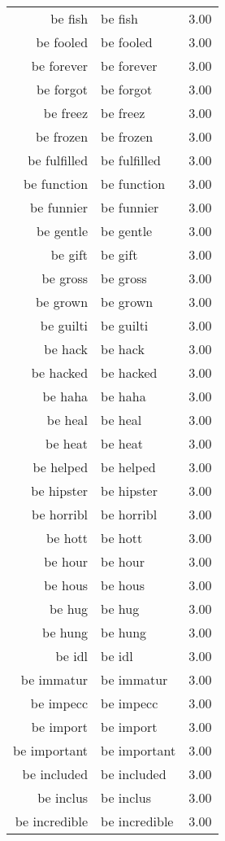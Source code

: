 \begin{table}[ht]
\begin{tabular}{rlr}
  be fish & be fish & 3.00 \\ 
  be fooled & be fooled & 3.00 \\ 
  be forever & be forever & 3.00 \\ 
  be forgot & be forgot & 3.00 \\ 
  be freez & be freez & 3.00 \\ 
  be frozen & be frozen & 3.00 \\ 
  be fulfilled & be fulfilled & 3.00 \\ 
  be function & be function & 3.00 \\ 
  be funnier & be funnier & 3.00 \\ 
  be gentle & be gentle & 3.00 \\ 
  be gift & be gift & 3.00 \\ 
  be gross & be gross & 3.00 \\ 
  be grown & be grown & 3.00 \\ 
  be guilti & be guilti & 3.00 \\ 
  be hack & be hack & 3.00 \\ 
  be hacked & be hacked & 3.00 \\ 
  be haha & be haha & 3.00 \\ 
  be heal & be heal & 3.00 \\ 
  be heat & be heat & 3.00 \\ 
  be helped & be helped & 3.00 \\ 
  be hipster & be hipster & 3.00 \\ 
  be horribl & be horribl & 3.00 \\ 
  be hott & be hott & 3.00 \\ 
  be hour & be hour & 3.00 \\ 
  be hous & be hous & 3.00 \\ 
  be hug & be hug & 3.00 \\ 
  be hung & be hung & 3.00 \\ 
  be idl & be idl & 3.00 \\ 
  be immatur & be immatur & 3.00 \\ 
  be impecc & be impecc & 3.00 \\ 
  be import & be import & 3.00 \\ 
  be important & be important & 3.00 \\ 
  be included & be included & 3.00 \\ 
  be inclus & be inclus & 3.00 \\ 
  be incredible & be incredible & 3.00 \\ 

\end{tabular}
\end{table}
